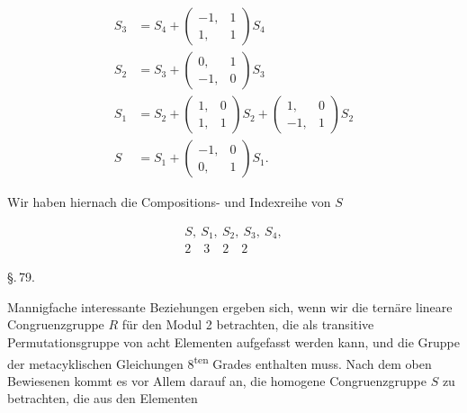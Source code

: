 \[
\begin{aligned}
S_3 &= S_4 + \begin{pmatrix} -1, & 1 \\ 1, & 1 \end{pmatrix} S_4 \\
S_2 &= S_3 + \begin{pmatrix} 0, & 1 \\ -1, & 0 \end{pmatrix} S_3 \\
S_1 &= S_2 + \begin{pmatrix} 1, & 0 \\ 1, & 1 \end{pmatrix} S_2 + \begin{pmatrix} 1, & 0 \\ -1, & 1 \end{pmatrix} S_2 \\
S &= S_1 + \begin{pmatrix} -1, & 0 \\ 0, & 1 \end{pmatrix} S_1.
\end{aligned}
\]

Wir haben hiernach die Compositions- und Indexreihe von $S$

\[
\begin{gathered}
S,\ S_1,\ S_2,\ S_3,\ S_4, \\
2 \quad 3 \quad 2 \quad 2
\end{gathered}
\]


\begin{center}
\S.\,79.

\end{center}

Mannigfache interessante Beziehungen ergeben sich, wenn
wir die tern\"are lineare Congruenzgruppe $R$ f\"ur den Modul 2
betrachten, die als transitive Permutationsgruppe von acht Elementen
 aufgefasst werden kann, und die Gruppe der metacyklischen
 Gleichungen 8\textsuperscript{ten} Grades enthalten muss. Nach dem
oben Bewiesenen kommt es vor Allem darauf an, die homogene
Congruenzgruppe $S$ zu betrachten, die aus den Elementen


